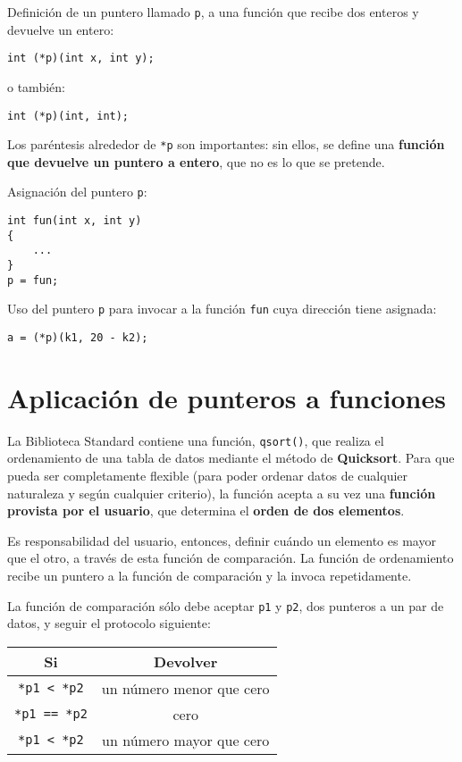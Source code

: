 \begin{ejemplo}
Definición de un puntero llamado \lstinline{p}, a una función que recibe dos enteros y devuelve un entero:
\begin{lstlisting}
int (*p)(int x, int y);
\end{lstlisting}

o también:
\begin{lstlisting}
int (*p)(int, int);
\end{lstlisting}

Los paréntesis alrededor de \lstinline{*p} son importantes: sin ellos, se define una
\textbf{función que devuelve un puntero a entero}, que no es lo que se pretende.

Asignación del puntero \lstinline{p}:
\begin{lstlisting}
int fun(int x, int y)
{
    ...
}
p = fun;
\end{lstlisting}
Uso del puntero \lstinline{p} para invocar a la función \lstinline{fun} cuya dirección tiene asignada:
\begin{lstlisting}
a = (*p)(k1, 20 - k2);
\end{lstlisting}
\end{ejemplo}

\section{Aplicación de punteros a funciones}
La Biblioteca Standard contiene una función, \lstinline{qsort()}, que realiza el ordenamiento de una
tabla de datos mediante el método de \textbf{Quicksort}. Para que pueda ser
completamente flexible (para poder ordenar datos de cualquier naturaleza y según cualquier criterio), la
función acepta a su vez una \textbf{función provista por el usuario}, que determina el
\textbf{orden de dos elementos}. 

Es responsabilidad del usuario, entonces, definir
cuándo un elemento es mayor que el otro, a través de esta función de
comparación. La función de ordenamiento recibe un puntero a la función de comparación y la
invoca repetidamente.

La función de comparación sólo debe aceptar \lstinline{p1} y \lstinline{p2}, dos punteros a un par de
datos, y seguir el protocolo siguiente:

\begin{tabular}{c|c}
Si & Devolver \\
\hline
\lstinline$*p1 < *p2$ & un número menor que cero\\
\hline
\lstinline$*p1 == *p2$ & cero\\
\hline
\lstinline$*p1 < *p2$ & un número mayor que cero\\
\end{tabular}

